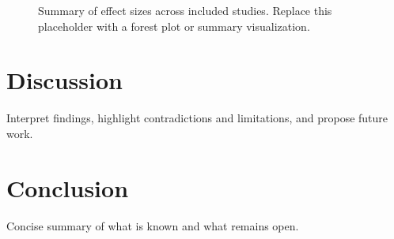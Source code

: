 \documentclass[11pt]{article}
\begin{document}
\begin{figure}[ht]
  \centering
  \caption{Summary of effect sizes across included studies. Replace this
  placeholder with a forest plot or summary visualization.}
  \label{fig:forest}
\end{figure}

\section{Discussion}
Interpret findings, highlight contradictions and limitations, and propose future work.

\section{Conclusion}
Concise summary of what is known and what remains open.



\end{document}
